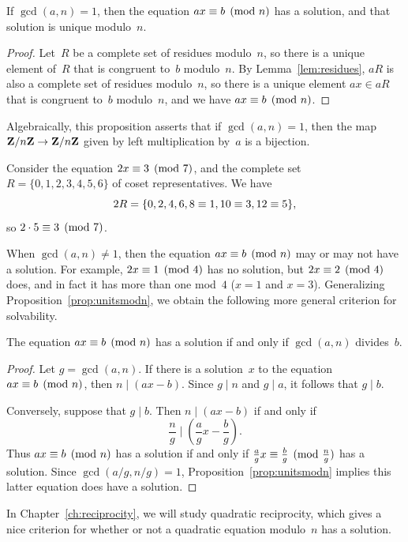 \begin{proposition}[Units]\label{prop:unitsmodn}
If $\gcd(a,n)=1$, then the equation
$
 ax\equiv b\pmod{n}
$
has a solution, and that solution is unique modulo~$n$.
\end{proposition}
\begin{proof}
Let~$R$ be a complete set of residues modulo~$n$, so there
is a unique element of~$R$ that is congruent to~$b$ modulo~$n$.
By Lemma~\ref{lem:residues},
$aR$ is also a complete set of residues modulo~$n$, so
there is a unique element $ax\in aR$ that is congruent
to~$b$ modulo~$n$, and we have $ax\equiv b\pmod{n}$.
\end{proof}
Algebraically, this proposition asserts that if $\gcd(a,n)=1$, then
the map $\mathbf{Z}/n\mathbf{Z}{}\rightarrow \mathbf{Z}/n\mathbf{Z}{}$ given by left multiplication by~$a$ is
a bijection.

\begin{example}
Consider the equation $2x\equiv 3\pmod{7}$,
and the complete set $R = \{0,1,2,3,4,5,6\}$
of coset representatives.  We have
$$
  2R = \{0,2,4,6,8\equiv 1, 10\equiv 3, 12\equiv 5\},
$$
so $2\cdot 5\equiv 3\pmod{7}$.
\end{example}

When $\gcd(a,n)\neq 1$, then the equation $ax\equiv b\pmod{n}$ may or
may not have a solution.  For example, $2x\equiv 1\pmod{4}$ has no
solution, but $2x\equiv 2\pmod{4}$ does, and in fact it has more than
one mod~$4$ ($x=1$ and $x=3$).  Generalizing
Proposition~\ref{prop:unitsmodn}, we obtain the following more general
criterion for solvability.
\begin{proposition}[Solvability]\label{prop:cancel2}
The equation $ax\equiv b\pmod{n}$ has a solution
if and only if $\gcd(a,n)$ divides~$b$.
\end{proposition}
\begin{proof}
  Let $g=\gcd(a,n)$.  If there is a solution~$x$ to the equation
  $ax\equiv b\pmod{n}$, then $n\mid (ax-b)$.  Since $g\mid n$ and $g\mid
  a$, it follows that $g\mid b$.

  Conversely, suppose that $g\mid b$.  Then $n\mid (ax-b)$ if and only
  if $$
  \frac{n}{g} \mid \left(\frac{a}{g} x - \frac{b}{g}\right).  $$
  Thus $ax\equiv b\pmod{n}$ has a solution if and only if $\frac{a}{g}x
  \equiv \frac{b}{g}\pmod{\frac{n}{g}}$ has a solution.  Since
  $\gcd(a/g, n/g)=1$, Proposition~\ref{prop:unitsmodn} implies this
  latter equation does have a solution.
\end{proof}

In Chapter~\ref{ch:reciprocity}, we will study quadratic reciprocity,
which gives a nice criterion for whether or not a quadratic equation
modulo~$n$ has a solution.

